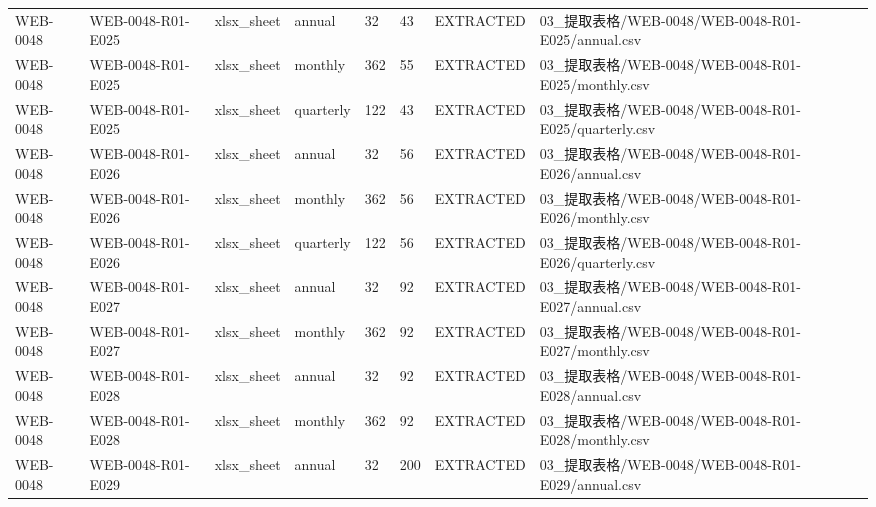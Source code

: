 \begin{landscape}
\begin{longtable}{p{1.8cm}p{2.2cm}p{3.1cm}p{4.7cm}p{1.3cm}p{1.3cm}p{3.0cm}p{5.3cm}}
WEB-0048 & WEB-0048-R01-E025 & xlsx\_\allowbreak{}sheet & annual & 32 & 43 & EXTRACTED & 03\_\allowbreak{}提取表格/\allowbreak{}WEB-0048/\allowbreak{}WEB-0048-R01-E025/\allowbreak{}annual.csv\\
WEB-0048 & WEB-0048-R01-E025 & xlsx\_\allowbreak{}sheet & monthly & 362 & 55 & EXTRACTED & 03\_\allowbreak{}提取表格/\allowbreak{}WEB-0048/\allowbreak{}WEB-0048-R01-E025/\allowbreak{}monthly.csv\\
WEB-0048 & WEB-0048-R01-E025 & xlsx\_\allowbreak{}sheet & quarterly & 122 & 43 & EXTRACTED & 03\_\allowbreak{}提取表格/\allowbreak{}WEB-0048/\allowbreak{}WEB-0048-R01-E025/\allowbreak{}quarterly.csv\\
WEB-0048 & WEB-0048-R01-E026 & xlsx\_\allowbreak{}sheet & annual & 32 & 56 & EXTRACTED & 03\_\allowbreak{}提取表格/\allowbreak{}WEB-0048/\allowbreak{}WEB-0048-R01-E026/\allowbreak{}annual.csv\\
WEB-0048 & WEB-0048-R01-E026 & xlsx\_\allowbreak{}sheet & monthly & 362 & 56 & EXTRACTED & 03\_\allowbreak{}提取表格/\allowbreak{}WEB-0048/\allowbreak{}WEB-0048-R01-E026/\allowbreak{}monthly.csv\\
WEB-0048 & WEB-0048-R01-E026 & xlsx\_\allowbreak{}sheet & quarterly & 122 & 56 & EXTRACTED & 03\_\allowbreak{}提取表格/\allowbreak{}WEB-0048/\allowbreak{}WEB-0048-R01-E026/\allowbreak{}quarterly.csv\\
WEB-0048 & WEB-0048-R01-E027 & xlsx\_\allowbreak{}sheet & annual & 32 & 92 & EXTRACTED & 03\_\allowbreak{}提取表格/\allowbreak{}WEB-0048/\allowbreak{}WEB-0048-R01-E027/\allowbreak{}annual.csv\\
WEB-0048 & WEB-0048-R01-E027 & xlsx\_\allowbreak{}sheet & monthly & 362 & 92 & EXTRACTED & 03\_\allowbreak{}提取表格/\allowbreak{}WEB-0048/\allowbreak{}WEB-0048-R01-E027/\allowbreak{}monthly.csv\\
WEB-0048 & WEB-0048-R01-E028 & xlsx\_\allowbreak{}sheet & annual & 32 & 92 & EXTRACTED & 03\_\allowbreak{}提取表格/\allowbreak{}WEB-0048/\allowbreak{}WEB-0048-R01-E028/\allowbreak{}annual.csv\\
WEB-0048 & WEB-0048-R01-E028 & xlsx\_\allowbreak{}sheet & monthly & 362 & 92 & EXTRACTED & 03\_\allowbreak{}提取表格/\allowbreak{}WEB-0048/\allowbreak{}WEB-0048-R01-E028/\allowbreak{}monthly.csv\\
WEB-0048 & WEB-0048-R01-E029 & xlsx\_\allowbreak{}sheet & annual & 32 & 200 & EXTRACTED & 03\_\allowbreak{}提取表格/\allowbreak{}WEB-0048/\allowbreak{}WEB-0048-R01-E029/\allowbreak{}annual.csv\\

\end{longtable}
\end{landscape}
